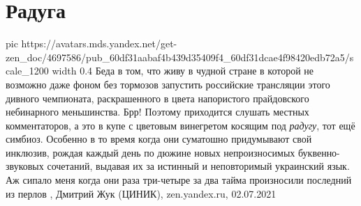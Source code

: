  
 
 
 
 
\chapter{Радуга}

\ifcmt
  pic https://avatars.mds.yandex.net/get-zen_doc/4697586/pub_60df31aabaf4b439d35409f4_60df31dcae4f98420edb72a5/scale_1200
	width 0.4
\fi
Беда в том, что живу в чудной стране в которой не возможно даже фоном без
тормозов запустить российские трансляции этого дивного чемпионата,
раскрашенного в цвета напористого прайдовского небинарного меньшинства. Брр!
Поэтому приходится слушать местных комментаторов, а это в купе с цветовым
винегретом косящим под \emph{радугу}, тот ещё симбиоз. Особенно в то время когда они
суматошно придумывают свой инклюзив, рождая каждый день по дюжине новых
непроизносимых буквенно-звуковых сочетаний, выдавая их за истинный и
неповторимый украинский язык. Аж сипало меня когда они раза три-четыре за два
тайма произносили последний из перлов
, Дмитрий Жук (ЦИНИК), zen.yandex.ru, 02.07.2021
